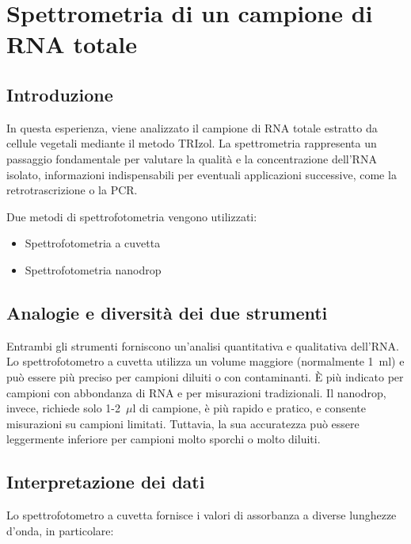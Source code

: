 \section {Spettrometria di un campione di RNA totale}

\subsection{Introduzione}

In questa esperienza, viene analizzato il campione di RNA totale estratto da cellule vegetali mediante il metodo TRIzol. La spettrometria rappresenta un passaggio fondamentale per valutare la qualità e la concentrazione dell’RNA isolato, informazioni indispensabili per eventuali applicazioni successive, come la retrotrascrizione o la PCR.
\newline

Due metodi di spettrofotometria vengono utilizzati:

\begin{itemize}
  \item {Spettrofotometria a cuvetta}
  \item {Spettrofotometria nanodrop}
\end{itemize}

\subsection{Analogie e diversità dei due strumenti}
Entrambi gli strumenti forniscono un’analisi quantitativa e qualitativa dell’RNA. Lo spettrofotometro a cuvetta utilizza un volume maggiore (normalmente 1~ml) e può essere più preciso per campioni diluiti o con contaminanti. È più indicato per campioni con abbondanza di RNA e per misurazioni tradizionali. Il nanodrop, invece, richiede solo 1-2~$\mu$l di campione, è più rapido e pratico, e consente misurazioni su campioni limitati. Tuttavia, la sua accuratezza può essere leggermente inferiore per campioni molto sporchi o molto diluiti.

\subsection{Interpretazione dei dati}

Lo spettrofotometro a cuvetta fornisce i valori di assorbanza a diverse lunghezze d’onda, in particolare:

